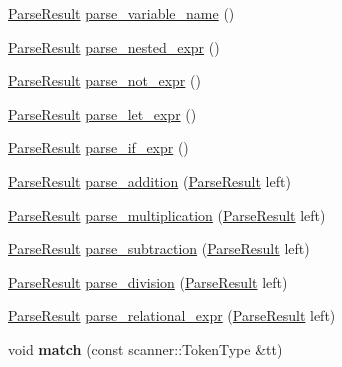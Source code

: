 \begin{DoxyCompactItemize}
\item 
\hyperlink{classfcal_1_1parser_1_1ParseResult}{Parse\+Result} \hyperlink{classfcal_1_1parser_1_1Parser_a42a63ca82e8a3401f9e1e5cf6942a17f}{parse\+\_\+variable\+\_\+name} ()
\item 
\hyperlink{classfcal_1_1parser_1_1ParseResult}{Parse\+Result} \hyperlink{classfcal_1_1parser_1_1Parser_a230ffe70c18b3dad6d10ddec36a35e2f}{parse\+\_\+nested\+\_\+expr} ()
\item 
\hyperlink{classfcal_1_1parser_1_1ParseResult}{Parse\+Result} \hyperlink{classfcal_1_1parser_1_1Parser_a2349961f9d8868b8089ea13ae9e98fb4}{parse\+\_\+not\+\_\+expr} ()
\item 
\hyperlink{classfcal_1_1parser_1_1ParseResult}{Parse\+Result} \hyperlink{classfcal_1_1parser_1_1Parser_afe47685e472719748894c8991853de30}{parse\+\_\+let\+\_\+expr} ()
\item 
\hyperlink{classfcal_1_1parser_1_1ParseResult}{Parse\+Result} \hyperlink{classfcal_1_1parser_1_1Parser_a4f0fe50e12d5693818bf37fbbdda6ad4}{parse\+\_\+if\+\_\+expr} ()
\item 
\hyperlink{classfcal_1_1parser_1_1ParseResult}{Parse\+Result} \hyperlink{classfcal_1_1parser_1_1Parser_a491fe4bd93f17982da6242143a418521}{parse\+\_\+addition} (\hyperlink{classfcal_1_1parser_1_1ParseResult}{Parse\+Result} left)
\item 
\hyperlink{classfcal_1_1parser_1_1ParseResult}{Parse\+Result} \hyperlink{classfcal_1_1parser_1_1Parser_af32daaf2d2a1b933cc3de2c940ee48c4}{parse\+\_\+multiplication} (\hyperlink{classfcal_1_1parser_1_1ParseResult}{Parse\+Result} left)
\item 
\hyperlink{classfcal_1_1parser_1_1ParseResult}{Parse\+Result} \hyperlink{classfcal_1_1parser_1_1Parser_a2a7d7d74a714bb560017b15e745cf36e}{parse\+\_\+subtraction} (\hyperlink{classfcal_1_1parser_1_1ParseResult}{Parse\+Result} left)
\item 
\hyperlink{classfcal_1_1parser_1_1ParseResult}{Parse\+Result} \hyperlink{classfcal_1_1parser_1_1Parser_a244da88d6e0fffb16df81a2d63599d12}{parse\+\_\+division} (\hyperlink{classfcal_1_1parser_1_1ParseResult}{Parse\+Result} left)
\item 
\hyperlink{classfcal_1_1parser_1_1ParseResult}{Parse\+Result} \hyperlink{classfcal_1_1parser_1_1Parser_a6de383f3ce806fdeb0a627b323cadc82}{parse\+\_\+relational\+\_\+expr} (\hyperlink{classfcal_1_1parser_1_1ParseResult}{Parse\+Result} left)
\item 
void {\bfseries match} (const scanner\+::\+Token\+Type \&tt)\hypertarget{classfcal_1_1parser_1_1Parser_a83087c1451996a4446a945e230a5a34c}{}\label{classfcal_1_1parser_1_1Parser_a83087c1451996a4446a945e230a5a34c}


\end{DoxyCompactItemize}
